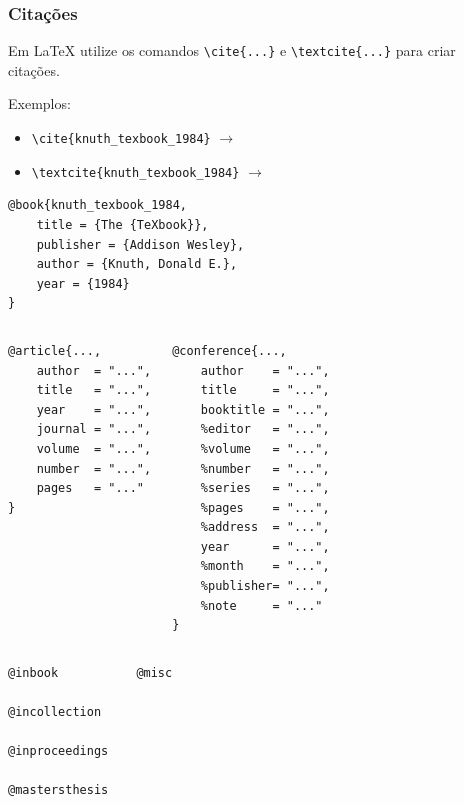\begin{frame}
\frametitle{Citações}
Em \LaTeX{} utilize os comandos \verb|\cite{...}| e \verb|\textcite{...}| para criar citações.

\vspace{1ex}
Exemplos:
\begin{itemize}
\item \verb|\cite{knuth_texbook_1984}| $\rightarrow$ \cite{knuth_texbook_1984}
\item \verb|\textcite{knuth_texbook_1984}| $\rightarrow$ \textcite{knuth_texbook_1984}
\end{itemize}

\begin{lstlisting}[language=tex, label=lst-bib, caption={Arquivo \texttt{.bib}.}, postbreak=\mbox{$\hookrightarrow$\space}, basicstyle=\fontsize{8}{10}\selectfont\ttfamily]
@book{knuth_texbook_1984,
    title = {The {TeXbook}},
    publisher = {Addison Wesley},
    author = {Knuth, Donald E.},
    year = {1984}
}
\end{lstlisting}

\framebreak

\begin{columns}[c]
\begin{verbatim}
@article{...,
    author  = "...",
    title   = "...",
    year    = "...",
    journal = "...",
    volume  = "...",
    number  = "...",
    pages   = "..."
}
\end{verbatim} 
\begin{verbatim}
@conference{...,
    author    = "...",
    title     = "...",
    booktitle = "...",
    %editor   = "...",
    %volume   = "...",
    %number   = "...",
    %series   = "...",
    %pages    = "...",
    %address  = "...",
    year      = "...",
    %month    = "...",
    %publisher= "...",
    %note     = "..."
}
\end{verbatim}
\end{columns}

\framebreak

\begin{columns}[c]
\begin{verbatim}
@inbook

@incollection

@inproceedings 

@mastersthesis
\end{verbatim} 
\begin{verbatim}
@misc 


\end{verbatim}
\end{columns}
\end{frame}
